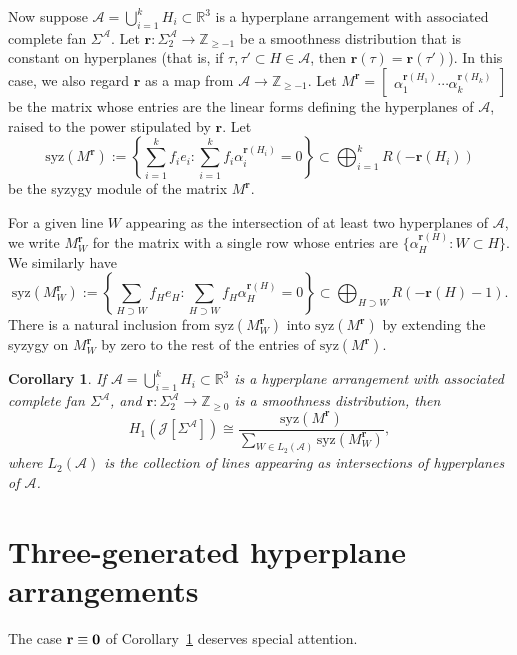 \documentclass[11pt, reqno]{amsart}
\newcommand{\RR}{\mathbb{R}}
\newcommand{\ZZ}{\mathbb{Z}}
\newcommand{\br}{\mathbf{r}}
\newcommand{\calJ}{\mathcal{J}}
\newcommand{\A}{\mathcal{A}}
\newcommand{\syz}{\mathrm{syz}}
\newtheorem{corollary}[theorem]{Corollary}
\theoremstyle{definition}
\theoremstyle{remark}
\numberwithin{equation}{section}
\begin{document}
Now suppose $\A=\bigcup_{i=1}^k H_i\subset\RR^3$ is a hyperplane arrangement with associated complete fan $\Sigma^\A$.  Let $\br:\Sigma^\A_2\to \ZZ_{\ge -1}$ be a smoothness distribution that is constant on hyperplanes (that is, if $\tau,\tau'\subset H\in\A$, then $\br(\tau)=\br(\tau')$).  In this case, we also regard $\br$ as a map from $\A\to\ZZ_{\ge -1}$.  Let $M^{\br}=\begin{bmatrix} \alpha_1^{\br(H_1)} \cdots \alpha_k^{\br(H_k)} \end{bmatrix}$ be the matrix whose entries are the linear forms defining the hyperplanes of $\A$, raised to the power stipulated by $\br$.  Let
\[
\syz(M^{\br}):=\left\lbrace\sum_{i=1}^k f_ie_i: \sum_{i=1}^k f_i\alpha_i^{\br(H_i)}=0\right\rbrace\subset \bigoplus_{i=1}^k R(-\br(H_i))
\]
be the syzygy module of the matrix $M^{\br}$.  

For a given line $W$ appearing as the intersection of at least two hyperplanes of $\A$, we write $M^{\br}_{W}$ for the matrix with a single row whose entries are $\{\alpha_{H}^{\br(H)}:W\subset H\}$.  We similarly have
\[
\syz(M^{\br}_W):=\left\lbrace\sum_{H\supset W} f_He_H: \sum_{H\supset W} f_H\alpha_H^{\br(H)}=0\right\rbrace\subset \bigoplus_{H\supset W} R(-\br(H)-1).
\]
There is a natural inclusion from $\syz(M^{\br}_W)$ into $\syz(M^{\br})$ by extending the syzygy on $M^{\br}_W$ by zero to the rest of the entries of $\syz(M^{\br})$.

\begin{corollary}\label{cor:HyperplaneH1pres}
If $\A=\bigcup_{i=1}^k H_i\subset\RR^3$ is a hyperplane arrangement with associated complete fan $\Sigma^\A$, and $\br:\Sigma^{\A}_2\to\ZZ_{\ge 0}$ is a smoothness distribution, then
\[
H_1(\calJ[\Sigma^\A])\cong \dfrac{\syz (M^\br)}{\sum_{W\in L_2(\A)} \syz(M^{\br}_W)},
\]
where $L_2(\A)$ is the collection of lines appearing as intersections of hyperplanes of $\A$.
\end{corollary}

\section{Three-generated hyperplane arrangements}

The case $\br\equiv \bf{0}$ of Corollary~\ref{cor:HyperplaneH1pres} deserves special attention.
\end{document}
